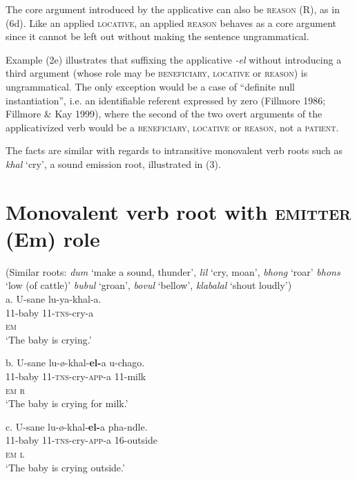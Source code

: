   The core argument introduced by the applicative can also be \textsc{reason} (R), as in (6d). Like an applied \textsc{locative}, an applied \textsc{reason} behaves as a core argument since it cannot be left out without making the sentence ungrammatical. 

  Example (2e) illustrates that suffixing the applicative \textit{{}-el} without introducing a third argument (whose role may be \textsc{beneficiary}, \textsc{locative} or \textsc{reason}) is ungrammatical. The only exception would be a case of “definite null instantiation”, i.e. an identifiable referent expressed by zero (Fillmore 1986; Fillmore \& Kay 1999), where the second of the two overt arguments of the applicativized verb would be a \textsc{beneficiary}, \textsc{locative} or \textsc{reason}, not a \textsc{patient}.

  The facts are similar with regards to intransitive monovalent verb roots such as \textit{khal} ‘cry’, a sound emission root, illustrated in (3). 

\chapter[Monovalent verb root with emitter (Em) role]{Monovalent verb root with \textsc{emitter} (Em) role}
     (Similar roots: \textit{dum} ‘make a sound, thunder’, \textit{lil }‘cry, moan’, \textit{bhong} ‘roar’ \textit{bhons} ‘low (of cattle)’ \textit{bubul} ‘groan’, \textit{bovul} ‘bellow’, \textit{klabalal} ‘shout loudly’)\\
\gll   a.    U-sane    lu-ya-khal-a.\\
         11-baby      11-\textsc{tns}{}-cry-a   \\
         \textsc{em}\\
\glt     ‘The baby is crying.’
\z

\gll   b.   U-sane   lu-ø-khal-\textbf{el-}a       u-chago. \\
         11-baby     11-\textsc{tns}{}-cry-\textsc{app}{}-a    11-milk\\
         \textsc{em                       r}\\
\glt     ‘The baby is crying for milk.’ 
\z

\gll   c.   U-sane     lu-ø-khal-\textbf{el-}a          pha-ndle.\\
         11-baby      11-\textsc{tns}{}-cry-\textsc{app}{}-a    16-outside\\
         \textsc{em                          l}\\
\glt     ‘The baby is crying outside.’
\z

